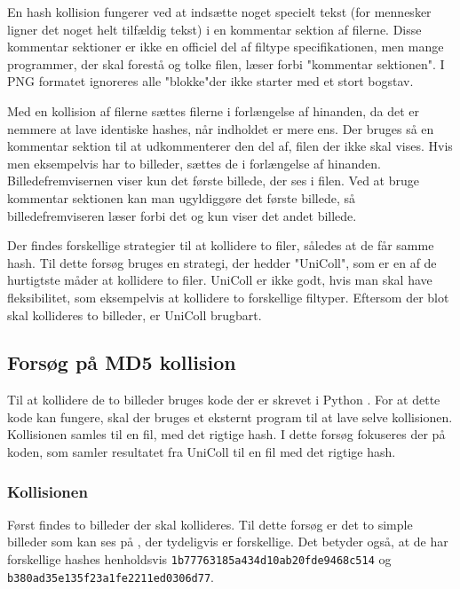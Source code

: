 \documentclass[12pt]{article}
\begin{document}
En hash kollision fungerer ved at indsætte noget specielt tekst (for mennesker ligner det noget helt tilfældig tekst) i en kommentar sektion af filerne. Disse kommentar sektioner er ikke en officiel del af filtype specifikationen, men mange programmer, der skal forestå og tolke filen, læser forbi "kommentar sektionen". I PNG formatet ignoreres alle "blokke"\footnotemark[9] der ikke starter med et stort bogstav. \cite{noauthor_hash_2022}

Med en kollision af filerne sættes filerne i forlængelse af hinanden, da det er nemmere at lave identiske hashes, når indholdet er mere ens. Der bruges så en kommentar sektion til at udkommenterer den del af, filen der ikke skal vises. Hvis men eksempelvis har to billeder, sættes de i forlængelse af hinanden. Billedefremvisernen viser kun det første billede, der ses i filen. Ved at bruge kommentar sektionen kan man ugyldiggøre det første billede, så billedefremviseren læser forbi det og kun viser det andet billede. \cite{noauthor_hash_2022}

Der findes forskellige strategier til at kollidere to filer, således at de får samme hash. Til dette forsøg bruges en strategi, der hedder "UniColl", som er en af de hurtigtste måder at kollidere to filer. UniColl er ikke godt, hvis man skal have fleksibilitet, som eksempelvis at kollidere to forskellige filtyper. Eftersom der blot skal kollideres to billeder, er UniColl brugbart.  


\subsection{Forsøg på MD5 kollision}
Til at kollidere de to billeder bruges kode der er skrevet i Python \cite{noauthor_hash_2022-1}.
For at dette kode kan fungere, skal der bruges et eksternt program til at lave selve kollisionen. Kollisionen samles til en fil, med det rigtige hash. I dette forsøg fokuseres der på koden, som samler resultatet fra UniColl til en fil med det rigtige hash. 

\subsubsection{Kollisionen}
Først findes to billeder der skal kollideres. Til dette forsøg er det to simple billeder som kan ses på \figureautorefname{~\ref{fig:coll-before}}, der tydeligvis er forskellige. Det betyder også, at de har forskellige hashes henholdsvis \verb|1b77763185a434d10ab20fde9468c514| og \verb|b380ad35e135f23a1fe2211ed0306d77|. 
\end{document}
